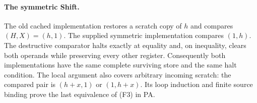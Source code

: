 \paragraph{The symmetric Shift.}
The old cached implementation restores a scratch copy of $h$ and compares
$(H,X)=(h,1)$. The supplied symmetric implementation compares $(1,h)$.
The destructive comparator halts exactly at equality and, on inequality,
clears both operands while preserving every other register. Consequently
both implementations have the same complete surviving store and the same
halt condition. The local argument also covers arbitrary incoming scratch:
the compared pair is $(h+x,1)$ or $(1,h+x)$. Its loop induction and finite
source binding prove the last equivalence of (F3) in PA.

